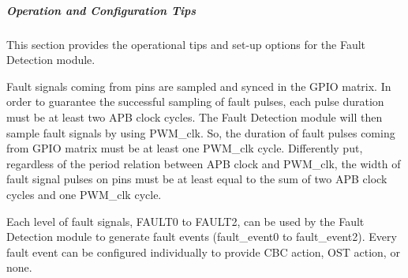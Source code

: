 \documentclass[main\_\_EN.tex]{subfiles}
\begin{document}
\subparagraph{Operation and Configuration Tips}
This section provides the operational tips and set-up options for the Fault Detection module.

Fault signals coming from pins are sampled and synced in the GPIO matrix. In order to guarantee the successful sampling of fault pulses, each pulse duration must be at least two APB clock cycles. The Fault Detection module will then sample fault signals by using PWM\_clk. So, the duration of fault pulses coming from GPIO matrix must be at least one PWM\_clk cycle. Differently put, regardless of the period relation between APB clock and PWM\_clk, the width of fault signal pulses on pins must be at least equal to the sum of two APB clock cycles and one PWM\_clk cycle.

Each level of fault signals, FAULT0 to FAULT2, can be used by the Fault Detection module to generate fault events (fault\_event0 to fault\_event2). Every fault event can be configured individually to provide CBC action, OST action, or none.
\end{document}
